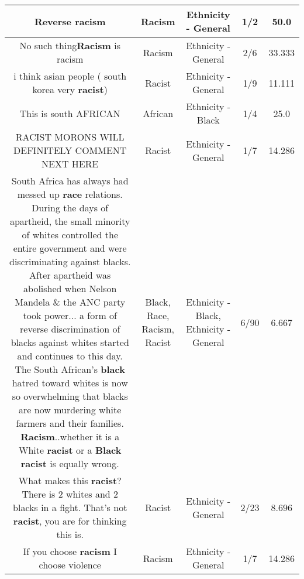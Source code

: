 \documentclass[11pt]{article}
\newlength\mylength
\begin{document}
\begin{center}
\begin{longtable}{|C{.65\mylength}|C{.30\mylength}|C{.12\mylength}|C{.12\mylength}|C{.12\mylength}|}
  \small Reverse racism\normalsize   & Racism & Ethnicity - General & 1/2 & 50.0 \\  \hline
  \small No such thing\textbf{Racism} is racism\normalsize   & Racism & Ethnicity - General & 2/6 & 33.333 \\  \hline
  \small i think asian people ( south korea very \textbf{racist})\normalsize   & Racist & Ethnicity - General & 1/9 & 11.111 \\  \hline
  \small This is south AFRICAN\normalsize   & African & Ethnicity - Black & 1/4 & 25.0 \\  \hline
  \small RACIST MORONS WILL DEFINITELY COMMENT NEXT HERE\normalsize   & Racist & Ethnicity - General & 1/7 & 14.286 \\  \hline
  \small South Africa has always had messed up \textbf{race} relations.  During the days of apartheid, the small minority of whites controlled the entire government and were discriminating against blacks.  After apartheid was abolished when Nelson Mandela \& the ANC party took power... a form of reverse discrimination of blacks against whites started and continues to this day. The South African's \textbf{black} hatred toward whites is now so overwhelming that blacks are now murdering white farmers and their families.  \textbf{Racism}..whether it is a White \textbf{racist} or a \textbf{Black} \textbf{racist} is equally wrong.\normalsize   & Black, Race, Racism, Racist & Ethnicity - Black, Ethnicity - General & 6/90 & 6.667 \\  \hline
  \small What makes this \textbf{racist}? There is 2 whites and 2 blacks in a fight. That's not \textbf{racist}, you are for thinking this is.\normalsize   & Racist & Ethnicity - General & 2/23 & 8.696 \\  \hline
  \small If you choose \textbf{racism} I choose violence\normalsize   & Racism & Ethnicity - General & 1/7 & 14.286 \\  \hline

\end{longtable}
\end{center}
\end{document}
